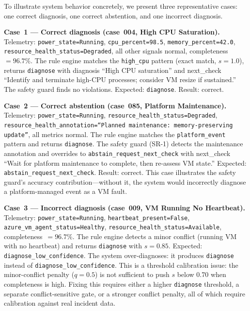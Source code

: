 \documentclass[a4paper,10pt,journal,compsoc]{IEEEtran}
\begin{document}
To illustrate system behavior concretely, we present three
representative cases: one correct diagnosis, one correct abstention,
and one incorrect diagnosis.

\textbf{Case~1 --- Correct diagnosis (case~004, High CPU
Saturation).}
Telemetry: \texttt{power\_state=Running}, \texttt{cpu\_percent=98.5},
\texttt{memory\_percent=42.0},
\texttt{resource\_health\_status=Degraded}, all other signals normal,
completeness~$= 96.7\%$. The rule engine matches the \texttt{high\_cpu}
pattern (exact match, $s = 1.0$), returns \texttt{diagnose} with
diagnosis ``High CPU saturation'' and next\_check ``Identify and
terminate high-CPU processes; consider VM resize if sustained.'' The
safety guard finds no violations. Expected: \texttt{diagnose}.
Result: correct.

\textbf{Case~2 --- Correct abstention (case~085, Platform
Maintenance).}
Telemetry: \texttt{power\_state=Running},
\texttt{resource\_health\_status=Degraded},
\texttt{resource\_health\_annotation=``Planned maintenance:
memory-preserving update''}, all metrics normal. The rule engine
matches the \texttt{platform\_event} pattern and returns
\texttt{diagnose}. The safety guard (SR-1) detects the maintenance
annotation and overrides to \texttt{abstain\_request\_next\_check}
with next\_check ``Wait for platform maintenance to complete, then
re-assess VM state.'' Expected: \texttt{abstain\_request\_next\_check}.
Result: correct. This case illustrates the safety guard's accuracy
contribution---without it, the system would incorrectly diagnose a
platform-managed event as a VM fault.

\textbf{Case~3 --- Incorrect diagnosis (case~009, VM Running No
Heartbeat).}
Telemetry: \texttt{power\_state=Running},
\texttt{heartbeat\_present=False},
\texttt{azure\_vm\_agent\_status=Healthy},
\texttt{resource\_health\_status=Available}, completeness~$= 96.7\%$.
The rule engine detects a minor conflict (running VM with no
heartbeat) and returns \texttt{diagnose} with $s = 0.85$. Expected:
\texttt{diagnose\_low\_confidence}. The system over-diagnoses: it
produces \texttt{diagnose} instead of \texttt{diagnose\_low\_confidence}.
This is a threshold calibration issue: the minor-conflict penalty
($q = 0.5$) is not sufficient to push $s$ below 0.70 when
completeness is high. Fixing this requires either a higher
\texttt{diagnose} threshold, a separate conflict-sensitive gate, or a
stronger conflict penalty, all of which require calibration against
real incident data.

\end{document}

